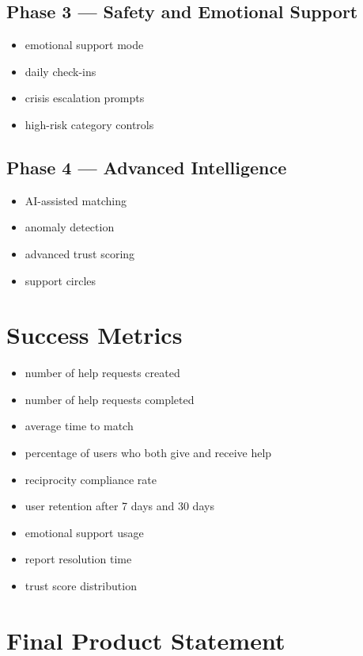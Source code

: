\documentclass[11pt]{article}
\begin{document}
\subsection{Phase 3 --- Safety and Emotional Support}
\begin{itemize}[leftmargin=1.5em]
    \item emotional support mode
    \item daily check-ins
    \item crisis escalation prompts
    \item high-risk category controls
\end{itemize}

\subsection{Phase 4 --- Advanced Intelligence}
\begin{itemize}[leftmargin=1.5em]
    \item AI-assisted matching
    \item anomaly detection
    \item advanced trust scoring
    \item support circles
\end{itemize}

\section{Success Metrics}

\begin{itemize}[leftmargin=1.5em]
    \item number of help requests created
    \item number of help requests completed
    \item average time to match
    \item percentage of users who both give and receive help
    \item reciprocity compliance rate
    \item user retention after 7 days and 30 days
    \item emotional support usage
    \item report resolution time
    \item trust score distribution
\end{itemize}

\section{Final Product Statement}
\end{document}
